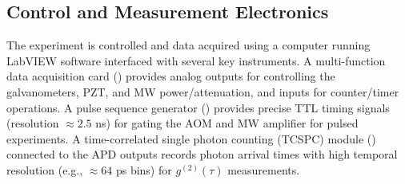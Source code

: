 \documentclass[aps,prb,twocolumn,superscriptaddress,floatfix,longbibliography,citeautoscript]{revtex4-2}
\begin{document}
\subsection{\label{sec:control}Control and Measurement Electronics}
The experiment is controlled and data acquired using a computer running LabVIEW software interfaced with several key instruments. A multi-function data acquisition card () provides analog outputs for controlling the galvanometers, PZT, and MW power/attenuation, and inputs for counter/timer operations. 
A pulse sequence generator () provides precise TTL timing signals (resolution $\approx 2.5$ ns) for gating the AOM and MW amplifier for pulsed experiments. 
A time-correlated single photon counting (TCSPC) module () connected to the APD outputs records photon arrival times with high temporal resolution (e.g., $\approx 64$ ps bins) for $g^{(2)}(\tau)$ measurements.
\end{document}
